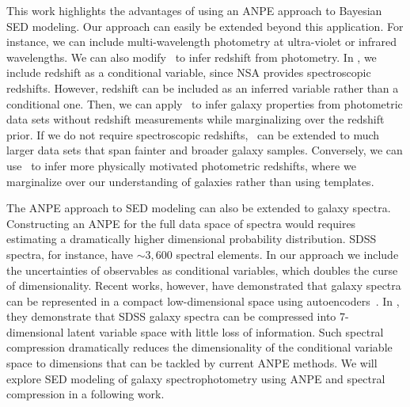 This work highlights the advantages of using an ANPE approach to Bayesian SED
modeling. 
Our approach can easily be extended beyond this application. 
For instance, we can include multi-wavelength photometry at ultra-violet or
infrared wavelengths. 
We can also modify \sedflow~to infer redshift from photometry. 
In \sedflow, we include redshift as a conditional variable, since NSA provides
spectroscopic redshifts. 
However, redshift can be included as an inferred variable rather than a
conditional one. 
Then, we can apply \sedflow~to infer galaxy properties from photometric data
sets without redshift measurements while marginalizing over the redshift
prior. 
If we do not require spectroscopic redshifts, \sedflow~can be extended to much
larger data sets that span fainter and broader galaxy samples. 
Conversely, we can use \sedflow~to infer more physically motivated photometric 
redshifts, where we marginalize over our understanding of galaxies rather than
using templates. 

The ANPE approach to SED modeling can also be extended to galaxy spectra. 
Constructing an ANPE for the full data space of spectra would requires
estimating a dramatically higher dimensional probability distribution. 
SDSS spectra, for instance, have ${\sim}3,600$ spectral elements.  
In our approach we include the uncertainties of observables as conditional
variables, which doubles the curse of dimensionality.
Recent works, however, have demonstrated that galaxy spectra can be represented
in a compact low-dimensional space using autoencoders~\citep[][Melchior \&
Hahn, in prep.]{portillo2020}.
In \cite{portillo2020}, they demonstrate that SDSS galaxy spectra can be
compressed into 7-dimensional latent variable space with little loss of
information. 
Such spectral compression dramatically reduces the dimensionality of the
conditional variable space to dimensions that can be tackled by current ANPE
methods. 
We will explore SED modeling of galaxy spectrophotometry using ANPE and
spectral compression in a following work. 
